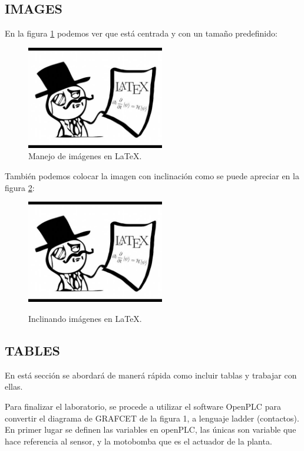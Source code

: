 \documentclass[journal, spanish]{IEEEtran}
\begin{document}
\subsection{IMAGES}
\noindent
En la figura \ref{fig:led_Frit} podemos ver que está centrada y con un tamaño predefinido:
\begin{figure}[H]%
    \begin {center}
    \includegraphics[width=6cm, height=4.5cm]{Images/Latex.jpeg}
    \caption{Manejo de imágenes en LaTeX.}
    \label{fig:led_Frit}
    \end {center}
\end{figure}

\noindent
También podemos colocar la imagen con inclinación como se puede apreciar en la figura \ref{fig:images}:
\begin{figure}[H]%
    \centering
    \caption{Inclinando imágenes en LaTeX.}
    \includegraphics[width=6cm, height=4.5cm, angle=180]{Images/Latex.jpeg}
    \label{fig:images}
\end{figure}
\subsection{TABLES}
En está sección se abordará de manerá rápida como incluir tablas y trabajar con ellas.
    
\noindent
Para finalizar el laboratorio, se procede a utilizar el software OpenPLC para convertir el diagrama de GRAFCET de la figura 1, a lenguaje ladder (contactos).
En primer lugar se definen las variables en openPLC, las únicas son variable que hace referencia al sensor, y la motobomba que es el actuador de la planta.
\end{document}
